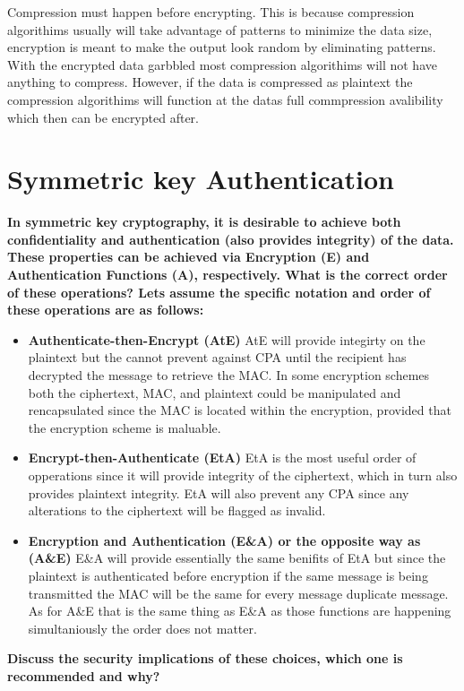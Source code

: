 \documentclass[letterpaper,11pt,notitlepage,fleqn]{article}
\begin{document}
Compression must happen before encrypting. This is because compression algorithims usually will take advantage of patterns to minimize the data size, encryption is meant to make the output look random by eliminating patterns. With the encrypted data garbbled most compression algorithims will not have anything to compress. However, if the data is compressed as plaintext the compression algorithims will function at the datas full commpression avalibility which then can be encrypted after. 

\section{Symmetric key Authentication}
\noindent \textbf{In  symmetric  key  cryptography,  it  is  desirable  to  achieve  both  confidentiality  and authentication  (also  provides  integrity)  of  the  data.  These  properties  can  be  achieved  via Encryption (E) and Authentication Functions (A), respectively. What is the correct order of these operations? Lets assume the specific notation and order of these operations are as follows:} 
\begin{itemize}
    \item \textbf{Authenticate-then-Encrypt (AtE)}
        AtE will provide integirty on the plaintext but the cannot prevent against CPA until the recipient has decrypted the message to retrieve the MAC. In some encryption schemes both the ciphertext, MAC, and plaintext could be manipulated and rencapsulated since the MAC is located within the encryption, provided that the encryption scheme is maluable. 
    \item \textbf{Encrypt-then-Authenticate (EtA)}
        EtA is the most useful order of opperations since it will provide integrity of the ciphertext, which in turn also provides plaintext integrity. EtA will also prevent any CPA since any alterations to the ciphertext will be flagged as invalid. 
    \item \textbf{Encryption and Authentication (E\&A) or the opposite way as (A\&E)}
        E\&A will provide essentially the same benifits of EtA but since the plaintext is authenticated before encryption if the same message is being transmitted the MAC will be the same for every message duplicate message. As for A\&E that is the same thing as E\&A as those functions are happening simultaniously the order does not matter.  
\end{itemize}

\noindent \textbf{Discuss the security implications of these choices, which one is recommended and why?}
\end{document}
